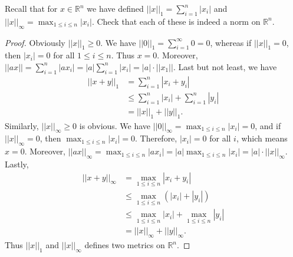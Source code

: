 \documentclass[12pt, a4paper]{article}
\theoremstyle{plain}
\newcommand{\R}{\mathbb{R}}
\begin{document}
\begin{exercise}{17}
Recall that for $x\in\R^n$ we have defined $||x||_1=\sum_{i=1}^{n}|x_i|$ and $||x||_\infty=\max_{1\leq i\leq n}|x_i|$. Check that each of these is indeed a norm on $\R^n$.
\end{exercise}
	\begin{proof}
	Obviously $||x||_1\geq 0$. We have $||0||_1=\sum_{i=1}^{\infty}0=0$, whereas if $||x||_1=0$, then $|x_i|=0$ for all $1\leq i\leq n$. Thus $x=0$. Moreover, $||ax||=\sum_{i=1}^n|ax_i|=|a|\sum_{i=1}^n|x_i|=|a|\cdot ||x_1||$. Last but not least, we have
	\begin{align*}
	||x+y||_1&=\sum_{i=1}^n|x_i+y_i|\\
	&\leq \sum_{i=1}^{n}{|x_i|}+\sum_{i=1}^{n}{|y_i|}\\
	&=||x||_1+||y||_1.
	\end{align*}
	Similarly, $||x||_\infty\geq 0$ is obvious. We have $||0||_\infty=\max_{1\leq i\leq n}|x_i|=0$, and if $||x||_\infty =0$, then $\max_{1\leq i\leq n}|x_i|=0$. Therefore, $|x_i|=0$ for all $i$, which means $x=0$. Moreover, $||ax||_\infty=\max_{1\leq i\leq n}|ax_i|=|a|\max_{1\leq i\leq n}|x_i|=|a|\cdot ||x||_\infty$. Lastly,
	\begin{align*}
	||x+y||_\infty &=\max_{1\leq i\leq n}|x_i+y_i|\\
	&\leq \max_{1\leq i\leq n}(|x_i|+|y_i|)\\
	&\leq \max_{1\leq i\leq n}|x_i|+\max_{1\leq i\leq n}|y_i|\\
	&= ||x||_\infty +||y||_\infty.
	\end{align*}
	Thus $||x||_1$ and $||x||_\infty$ defines two metrics on $\R^n$.
	\end{proof}
	
\end{document}
